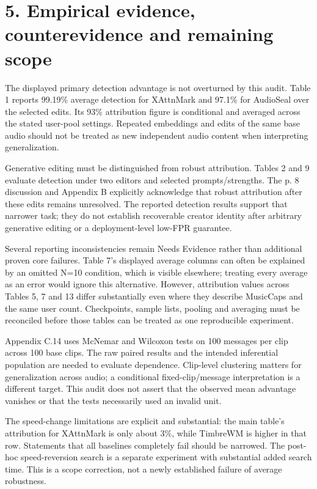 \documentclass[10pt]{article}
\begin{document}
\section*{5. Empirical evidence, counterevidence and remaining scope}
The displayed primary detection advantage is not overturned by this audit. Table 1 reports 99.19\% average detection for XAttnMark and 97.1\% for AudioSeal over the selected edits. Its 93\% attribution figure is conditional and averaged across the stated user-pool settings. Repeated embeddings and edits of the same base audio should not be treated as new independent audio content when interpreting generalization.\par
Generative editing must be distinguished from robust attribution. Tables 2 and 9 evaluate detection under two editors and selected prompts/strengths. The p. 8 discussion and Appendix B explicitly acknowledge that robust attribution after these edits remains unresolved. The reported detection results support that narrower task; they do not establish recoverable creator identity after arbitrary generative editing or a deployment-level low-FPR guarantee.\par
Several reporting inconsistencies remain Needs Evidence rather than additional proven core failures. Table 7’s displayed average columns can often be explained by an omitted N=10 condition, which is visible elsewhere; treating every average as an error would ignore this alternative. However, attribution values across Tables 5, 7 and 13 differ substantially even where they describe MusicCaps and the same user count. Checkpoints, sample lists, pooling and averaging must be reconciled before those tables can be treated as one reproducible experiment.\par
Appendix C.14 uses McNemar and Wilcoxon tests on 100 messages per clip across 100 base clips. The raw paired results and the intended inferential population are needed to evaluate dependence. Clip-level clustering matters for generalization across audio; a conditional fixed-clip/message interpretation is a different target. This audit does not assert that the observed mean advantage vanishes or that the tests necessarily used an invalid unit.\par
The speed-change limitations are explicit and substantial: the main table’s attribution for XAttnMark is only about 3\%, while TimbreWM is higher in that row. Statements that all baselines completely fail should be narrowed. The post-hoc speed-reversion search is a separate experiment with substantial added search time. This is a scope correction, not a newly established failure of average robustness.\par
\end{document}
